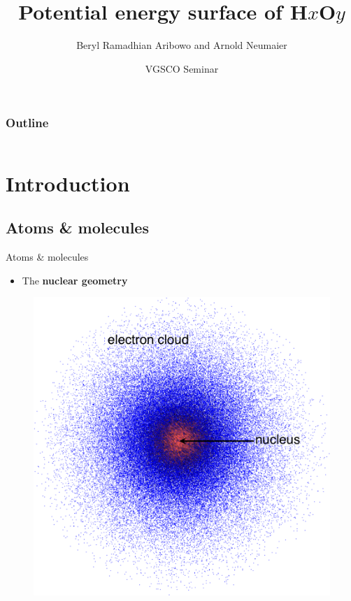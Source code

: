 \documentclass{beamer}
\title{Potential energy surface of H$x$O$y$}
\author[Aribowo, Neumaier] %
{Beryl Ramadhian Aribowo and Arnold Neumaier}
\institute[VFM] %
{
  Faculty of Mathematics\\
  University of Vienna
}
\date[VGSCO 2021] %
{VGSCO Seminar}
\begin{document}
\frame{\titlepage}

\begin{frame}
    \frametitle{Outline}
    \begin{columns}[t]
        \begin{column}{.6\textwidth}
            \tableofcontents[sections={1-2}]
        \end{column}
        \begin{column}{.4\textwidth}
            \tableofcontents[sections={3-5}]
        \end{column}
    \end{columns}
\end{frame}



\section{Introduction}
\subsection{Atoms \& molecules}
\begin{frame}{Atoms \& molecules}
    \begin{itemize}
        \item The \textbf{nuclear geometry}
    \end{itemize}
    \begin{figure}[htbp]
        \centering
        \includegraphics[scale=0.2]{img/slide/nuclear_geometry.png}
        \label{fig:nucleargeometry}
    \end{figure}
\end{frame}
\end{document}

